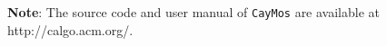 \documentclass[prodmode,acmtoms]{acmsmall}
\begin{document}
\medskip
\noindent \textbf{Note}: The source code and user manual of \texttt{CayMos} are available at http://calgo.acm.org/.


%
%
%
%
%
%
%
%
%
%
%
%
%
%
%
%
%
%
%
%
%
%
%
%
%
%
%
%
%
\end{document}
